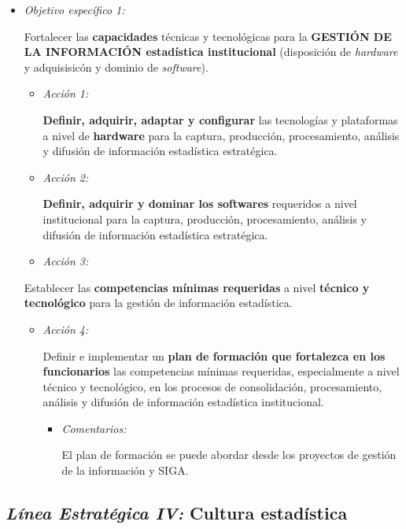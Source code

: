 \documentclass[
]{book}
\begin{document}
\begin{itemize}
\item
  \emph{Objetivo específico 1:}

  Fortalecer las \textbf{capacidades} técnicas y tecnológicas para la \textbf{GESTIÓN DE LA INFORMACIÓN estadística institucional} (disposición de \emph{hardware} y adquisisicón y dominio de \emph{software}).

  \begin{itemize}
  \item
    \emph{Acción 1:}

    \textbf{Definir, adquirir, adaptar y configurar} las tecnologías y plataformas a nivel de \textbf{hardware} para la captura, producción, procesamiento, análisis y difusión de información estadística estratégica.
  \item
    \emph{Acción 2:}

    \textbf{Definir, adquirir y dominar los softwares} requeridos a nivel institucional para la captura, producción, procesamiento, análisis y difusión de información estadística estratégica.
  \item
    \emph{Acción 3:}
  \end{itemize}

  Establecer las \textbf{competencias mínimas requeridas} a nivel \textbf{técnico y tecnológico} para la gestión de información estadística.

  \begin{itemize}
  \item
    \emph{Acción 4:}

    Definir e implementar un \textbf{plan de formación que fortalezca en los funcionarios} las competencias mínimas requeridas, especialmente a nivel técnico y tecnológico, en los procesos de consolidación, procesamiento, análisis y difusión de información estadística institucional.

    \begin{itemize}
    \item
      \emph{Comentarios:}

      El plan de formación se puede abordar desde los proyectos de gestión de la información y SIGA.
    \end{itemize}
  \end{itemize}
\end{itemize}

\hypertarget{luxednea-estratuxe9gica-iv-cultura-estaduxedstica}{%
\subsection{\texorpdfstring{\emph{Línea Estratégica IV:} Cultura estadística}{Línea Estratégica IV: Cultura estadística}}\label{luxednea-estratuxe9gica-iv-cultura-estaduxedstica}}
\end{document}
